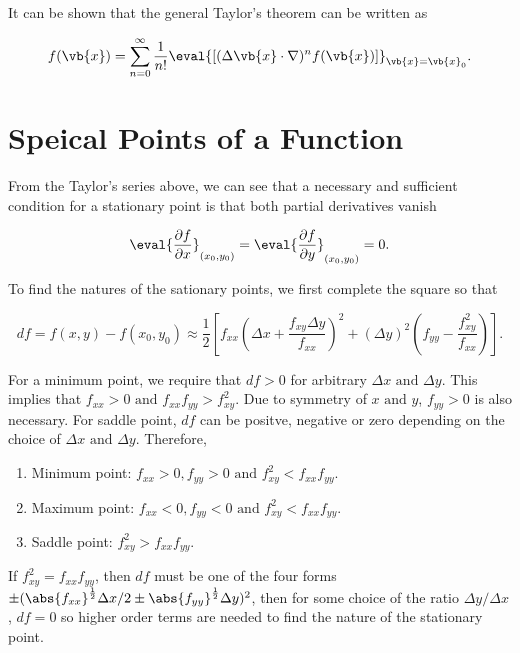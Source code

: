 \documentclass[english,a4paper,12pt]{report}
\begin{document}
It can be shown that the general Taylor's theorem can be written as 

\begin{equation}
    f(\vb{x} ) = \sum_{n=0}^{\infty} \frac{1}{n!} \eval{\left[ (\Delta \vb{x} \cdot \nabla )^{n} f(\vb{x} ) \right]}_{\vb{x} = \vb{x} _{0}}  .
\end{equation}

\section{Speical Points of a Function}

From the Taylor's series above, we can see that a necessary and sufficient condition for a stationary point is that both partial derivatives vanish

\begin{equation}
    \eval{\frac{\partial f}{\partial x}}_{(x_0 ,y_0 )} = \eval{\frac{\partial f}{\partial y}}_{(x_0 ,y_0 )} =0.
\end{equation}

To find the natures of the sationary points, we first complete the square so that 

\begin{equation}
    df = f(x,y) - f(x_0 , y_0 ) \approx  \frac{1}{2} \left[ f_{xx}\left( \Delta x+ \frac{f_{xy}\Delta y }{f_{xx} }  \right)^2 + (\Delta y)^2\left( f_{yy} - \frac{f_{xy}^2 }{f_{xx} }   \right)  \right].
\end{equation}

For a minimum point, we require that \(df>0\) for arbitrary \(\Delta x \text { and } \Delta y\). This implies that \(f_{xx} >0 \text { and }  f_{xx}f_{yy} > f_{xy}^2\). Due to symmetry of \(x \text { and } y\), \(f_{y y } >0\) is also necessary. For saddle point, \(df\) can be positve, negative or zero depending on the choice of \(\Delta x \text { and } \Delta y\). Therefore,

\begin{enumerate}
    \item Minimum point: \(f_{xx} > 0, f_{yy} > 0 \text { and } f_{xy}^2 < f_{xx}f_{yy}\).
    \item Maximum point: \(f_{xx} < 0, f_{yy} < 0 \text { and } f_{xy}^2 < f_{xx}f_{yy}\).
    \item Saddle point: \(f_{xy}^2 > f_{xx}f_{yy}\). 
\end{enumerate}

If \(f_{xy}^2 = f_{xx}f_{yy}\), then \(df\) must be one of the four forms \(\pm  (\abs{f_{xx} }^{\frac{1}{2} } \Delta x /2 \pm \abs{f_{yy} }^{\frac{1}{2} }\Delta y)^2\), then for some choice of the ratio \(\Delta y / \Delta x\), \(df = 0\) so higher order terms are needed to find the nature of the stationary point. 
\end{document}
